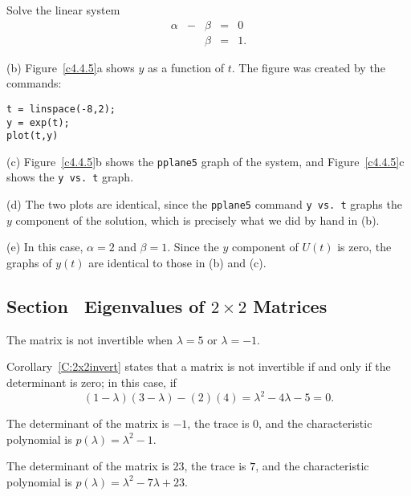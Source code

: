 \documentclass{ximera}
\begin{document}
\soln Solve the linear system
\[
\begin{array}{rrrrl}
\alpha & - & \beta & = & 0 \\
& & \beta & = & 1. \end{array}
\]

(b) Figure~\ref{c4.4.5}a shows $y$ as a function of $t$.  The figure
was created by the \Matlab commands:
\begin{verbatim}
t = linspace(-8,2);
y = exp(t);
plot(t,y)
\end{verbatim}

(c) Figure~\ref{c4.4.5}b shows the {\tt pplane5} graph of the system,
and Figure~\ref{c4.4.5}c shows the {\tt y vs.\ t} graph.

(d) The two plots are identical, since the {\tt pplane5} command
{\tt y vs.\ t} graphs the $y$ component of the solution, which is
precisely what we did by hand in (b).

(e) In this case, $\alpha = 2$ and $\beta = 1$.  Since the $y$
component of $U(t)$ is zero, the graphs of $y(t)$ are identical
to those in (b) and (c).

\begin{figure}[htb]
                       \centerline{%
                       }
\end{figure}





\subsection*{Section~\protect{\ref{S:evchp}} Eigenvalues of $2\times 2$ Matrices}

\ans The matrix is not invertible when $\lambda = 5$ or $\lambda = -1$.

\soln Corollary~\ref{C:2x2invert} states that a matrix is not invertible
if and only if the determinant is zero; in this case, if
\[
(1 - \lambda)(3 - \lambda) - (2)(4) = \lambda^2 - 4\lambda - 5 = 0.
\]


\newpage
{} The determinant of the matrix is $-1$, the trace is $0$, and
the characteristic polynomial is $p(\lambda)=\lambda^2-1$.

 The determinant of the matrix is $23$, the trace is $7$, and
the characteristic polynomial is $p(\lambda)=\lambda^2-7\lambda+23$.
\end{document}
